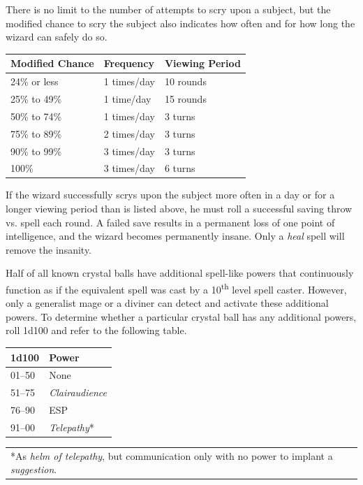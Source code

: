 \begin{multicols}{2}
There is no limit to the number of attempts to scry upon a subject, but the modified chance to scry the subject also indicates how often and for how long the wizard can safely do so.
 
\noindent \begin{tabular}{|m{}|m{}|m{}|}
\hline
Modified Chance	& Frequency	& Viewing Period \\
\hline\hline
\rowcolor[gray]{.9}24\% or less	& 1 times/day	& 10 rounds \\
25\% to 49\%	& 1 time/day	& 15 rounds \\
\rowcolor[gray]{.9}50\% to 74\%	& 1 times/day	& 3 turns \\
75\% to 89\%	& 2 times/day	& 3 turns \\
\rowcolor[gray]{.9}90\% to 99\%	& 3 times/day	& 3 turns \\
100\%	& 3 times/day	& 6 turns \\
\hline
\end{tabular}

If the wizard successfully scrys upon the subject more often in a day or for a longer viewing period than is listed above, he must roll a successful saving throw vs. spell each round.  A failed save results in a permanent loss of one point of intelligence, and the wizard becomes permanently insane.  Only a \textit{heal} spell will remove the insanity.  

Half of all known crystal balls have additional spell-like powers that continuously function as if the equivalent spell was cast by a 10\textsuperscript{th} level spell caster.  However, only a generalist mage or a diviner can detect and activate these additional powers.  To determine whether a particular crystal ball has any additional powers, roll 1d100 and refer to the following table.
 
\noindent \begin{tabular}{|p{}|p{}|}
\hline
1d100	& Power \\
\hline\hline
\rowcolor[gray]{.9}01--50	& None \\
51--75	& \textit{Clairaudience} \\
\rowcolor[gray]{.9}76--90	& ESP \\
91--00	& \textit{Telepathy}* \\
\hline
\end{tabular}
\noindent\begin{tabular}{p{}}
*As \textit{helm of telepathy}, but communication only with no power to implant a \textit{suggestion}. \\
\end{tabular}\vspace{.5em}


\end{multicols}
